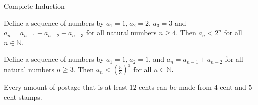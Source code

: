 \begin{section}{Complete Induction}
\begin{theorem}
Define a sequence of numbers by $a_1=1$, $a_2=2$, $a_3=3$ and $a_n=a_{n-1}+a_{n-2}+a_{n-3}$ for all natural numbers $n\geq 4$.  Then $a_n<2^n$ for all $n\in\mathbb N$.
\end{theorem}

\begin{theorem}
Define a sequence of numbers by $a_1=1$, $a_2=1$, and $a_n=a_{n-1}+a_{n-2}$ for all natural numbers $n \geq 3$.  Then $a_n < \left ( \frac{5}{3} \right )^n$ for all $n \in \mathbb{N}.$
\end{theorem}

\begin{theorem}
Every amount of postage that is at least $12$ cents can be made from $4$-cent and $5$-cent stamps.
\end{theorem}

\end{section}